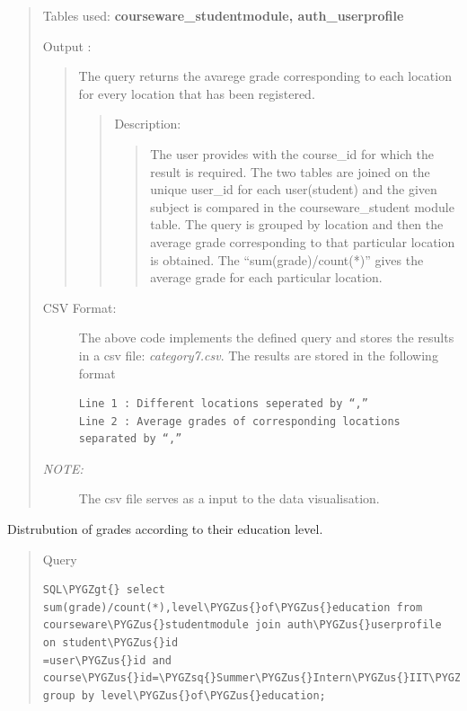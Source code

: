 \documentclass[a4paper,12pt,oneside]{sphinxmanual}
\def\PYGZus{\char`\_}
\def\PYGZgt{\char`\>}
\def\PYGZsq{\char`\'}
\begin{document}
\begin{itemize}
\begin{quote}
Tables used: \textbf{courseware\_studentmodule, auth\_userprofile}

Output :
\begin{quote}

The query returns the avarege grade corresponding to each location for every location that has been registered.
\begin{quote}

Description:
\begin{quote}

The user provides with the course\_id for which the result is required.
The two tables are joined on the unique user\_id for each user(student) and the given subject is compared in the courseware\_student module table.
The query is grouped by location and then the average grade corresponding to that particular location is obtained.
The ``sum(grade)/count(*)'' gives the average grade for each particular location.
\end{quote}
\end{quote}
\end{quote}
\begin{description}
\item[{CSV Format:}] \leavevmode
The above code implements the defined query and stores the results in a csv file: \emph{category7.csv}.
The results are stored in the following format

\begin{Verbatim}[commandchars=\\\{\}]
Line 1 : Different locations seperated by “,”
Line 2 : Average grades of corresponding locations
separated by “,”
\end{Verbatim}

\item[{\emph{NOTE:}}] \leavevmode
The csv file serves as a input to the data visualisation.

\end{description}
\end{quote}

Distrubution of grades according to their education level.
\begin{quote}

Query

\begin{Verbatim}[commandchars=\\\{\}]
SQL\PYGZgt{} select sum(grade)/count(*),level\PYGZus{}of\PYGZus{}education from
courseware\PYGZus{}studentmodule join auth\PYGZus{}userprofile on student\PYGZus{}id
=user\PYGZus{}id and course\PYGZus{}id=\PYGZsq{}Summer\PYGZus{}Intern\PYGZus{}IIT\PYGZus{}Mumbai/SI001/2014\PYGZus{}SI\PYGZus{}May\PYGZsq{}
group by level\PYGZus{}of\PYGZus{}education;
\end{Verbatim}


\end{quote}
\end{itemize}
\end{document}
